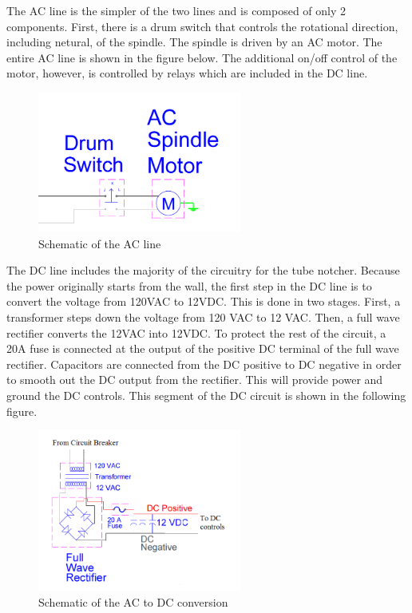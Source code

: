 The AC line is the simpler of the two lines and is composed of only 2 components. First, there is a drum switch that controls the rotational direction, including netural, of the spindle. The spindle is driven by an AC motor. The entire AC line is shown in the figure below. The additional on/off control of the motor, however, is controlled by relays which are included in the DC line.

\begin{figure}[H]
    \centering
    \includegraphics[width=0.6\textwidth]{./images/Chapter2-MachineDescription/AC}
    \caption{Schematic of the AC line}
    \label{fig:Electrical:AC}
\end{figure} 

The DC line includes the majority of the circuitry for the tube notcher. Because the power originally starts from the wall, the first step in the DC line is to convert the voltage from 120VAC to 12VDC. This is done in two stages. First, a transformer steps down the voltage from 120 VAC to 12 VAC. Then, a full wave rectifier converts the 12VAC into 12VDC. To protect the rest of the circuit, a 20A fuse is connected at the output of the positive DC terminal of the full wave rectifier. Capacitors are connected from the DC positive to DC negative in order to smooth out the DC output from the rectifier. This will provide power and ground the DC controls. This segment of the DC circuit is shown in the following figure.

\begin{figure}[H]
    \centering
    \includegraphics[width=0.6\textwidth]{./images/Chapter2-MachineDescription/ACDC}
    \caption{Schematic of the AC to DC conversion}
    \label{fig:Electrical:AC}
\end{figure} 


